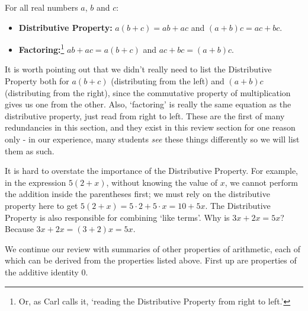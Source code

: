 \medskip

\label{distributiveproperty}

\colorbox{ResultColor}{\bbm
\begin{thm}
For all real numbers $a$, $b$ and $c$:

\begin{itemize}

\item  \textbf{Distributive Property:}   $a(b+c) = ab + ac$ and $(a+b)c = ac + bc$.

\item  \textbf{Factoring:}\footnote{Or, as Carl calls it, `reading the Distributive Property from right to left.'}   $ab+ac = a(b+c)$ and $ac + bc = (a+b)c$.

\end{itemize}
\end{thm}
\ebm}

\medskip

It is worth pointing out that we didn't really need to list the Distributive Property both for $a(b+c)$ (distributing from the left) and $(a+b)c$ (distributing from the right), since the commutative property of multiplication gives us one from the other.  Also, `factoring' is really the same equation as the distributive property, just read from right to left. These are the first of many redundancies in this section, and they exist in this review section for one reason only - in our experience, many students \textit{see} these things differently so we will list them as such.   

\medskip

It is hard to overstate the importance of the Distributive Property.  For example, in the expression $5(2+x)$, without knowing the value of $x$, we cannot perform the addition inside the parentheses first;  we must rely on the distributive property here to get  $5(2+x) = 5\cdot 2 + 5 \cdot x = 10 + 5x$.  The Distributive Property is also responsible for combining `like terms'.  Why is $3x + 2x = 5x$?  Because  $3x + 2x = (3+2)x = 5x$.  

\medskip

We continue our review with summaries of other properties of arithmetic, each of which can be derived from the properties listed above.  First up are properties of the additive identity $0$.

\medskip

